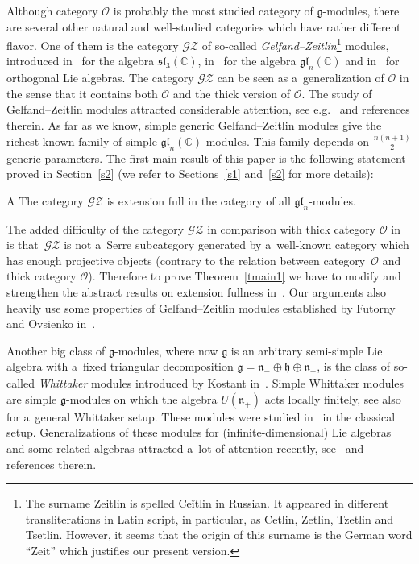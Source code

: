 \documentclass[pdftex]{sigma}
\begin{document}
Although category $\mathcal{O}$ is probably the most studied category of $\mathfrak{g}$-modules, there are several other
natural and well-studied categories which have rather dif\/ferent f\/lavor.
One of them is the category $\mathscr{G}\mathscr{Z}$ of
so-called {\em Gelfand--Zeitlin}\footnote{The surname Zeitlin is spelled {Ce{\u i}tlin} in Russian.
It appeared in dif\/ferent transliterations in Latin script, in particular, as Cetlin, Zetlin, Tzetlin and Tsetlin.
However, it seems that the origin of this surname is the German word ``Zeit'' which justif\/ies our present version.}
modules, introduced in~\cite{DFO1} for the algebra $\mathfrak{sl}_3(\mathbb{C})$, in~\cite{DFO2} for the algebra
$\mathfrak{gl}_n(\mathbb{C})$ and in~\cite{Ma2} for orthogonal Lie algebras.
The category $\mathscr{G}\mathscr{Z}$ can be seen as a~generalization of $\mathcal{O}$ in the sense that it contains
both $\mathcal{O}$ and the thick version of $\mathcal{O}$.
The study of Gelfand--Zeitlin modules attracted considerable attention, see
e.g.~\cite{DFO,FGR,FuOv1,FuOv2,Kh,KM,Ma1,Ma3,MaOv,MaSt,Ov,Ov2,Ra} and references therein.
As far as we know, simple generic Gelfand--Zeitlin modules give the richest known family of simple
$\mathfrak{gl}_n(\mathbb{C})$-modules.
This family depends on $\frac{n(n+1)}{2}$ generic parameters.
The f\/irst main result of this paper is the following statement proved in Section~\ref{s2} (we refer to Sections~\ref{s1}
and~\ref{s2} for more details):

\begin{customthm}{A}
\label{tmain1}
The category $\mathscr{G}\mathscr{Z}$ is extension full in the category of all $\mathfrak{gl}_n$-modules.
\end{customthm}

The added dif\/f\/iculty of the category $\mathscr{G}\mathscr{Z}$ in comparison with thick category $\mathcal{O}$
in~\cite{CoMa} is that~$\mathscr{G}\mathscr{Z}$ is not a~Serre subcategory generated by a~well-known category which has
enough projective objects (contrary to the relation between category~$\mathcal{O}$ and thick category $\mathcal{O}$).
Therefore to prove Theorem~\ref{tmain1} we have to modify and strengthen the abstract results on extension fullness
in~\cite{CoMa}.
Our arguments also heavily use some properties of Gelfand--Zeitlin modules established by Futorny and Ovsienko
in~\cite{FuOv2}.

Another big class of $\mathfrak{g}$-modules, where now $\mathfrak{g}$ is an arbitrary semi-simple Lie algebra with
a~f\/ixed triangular decomposition $\mathfrak{g}=\mathfrak{n}_-\oplus\mathfrak{h}\oplus \mathfrak{n}_+$, is the class of
so-called {\em Whittaker} modules introduced by Kostant in~\cite{Ko}.
Simple Whittaker modules are simple $\mathfrak{g}$-modules on which the algebra $U(\mathfrak{n}_+)$ acts locally
f\/initely, see also~\cite{BM} for a~general Whittaker setup.
These modules were studied in~\cite{KhMa,McD,McD2,MiSo,Se} in the classical setup.
Generalizations of these modules for (inf\/inite-dimensional) Lie algebras and some related algebras attracted a~lot of
attention recently, see~\cite{BCW,BM,BO,Ch,GL,On,WiOn1,WiOn2} and references therein.
\end{document}

